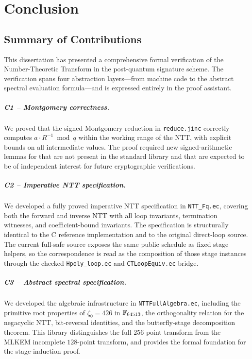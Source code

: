 
\chapter{Conclusion}
\label{ch:conclusion}

\section{Summary of Contributions}

This dissertation has presented a comprehensive formal verification of the
Number-Theoretic Transform in the \haetae{} post-quantum signature scheme.
The verification spans four abstraction layers---from \jasmin{} machine code
to the abstract spectral evaluation formula---and is expressed entirely in the
\easycrypt{} proof assistant.

\paragraph{C1 -- Montgomery correctness.}
We proved that the signed Montgomery reduction in \texttt{reduce.jinc}
correctly computes $a \cdot R^{-1} \bmod q$ within the working range of the
NTT, with explicit bounds on all intermediate values.  The proof required
new signed-arithmetic lemmas for \easycrypt{} that are not present in the
standard library and that are expected to be of independent interest for
future cryptographic verifications.

\paragraph{C2 -- Imperative NTT specification.}
We developed a fully proved imperative NTT specification in \texttt{NTT\_Fq.ec},
covering both the forward and inverse NTT with all loop invariants,
termination witnesses, and coefficient-bound invariants.  The specification is
structurally identical to the C reference implementation and to the original
direct-loop \jasmin{} source.  The current full-safe \jasmin{} source exposes
the same public schedule as fixed stage helpers, so the correspondence is read
as the composition of those stage instances through the checked
\texttt{Hpoly\_loop.ec} and \texttt{CTLoopEquiv.ec} bridge.

\paragraph{C3 -- Abstract spectral specification.}
We developed the algebraic infrastructure in \texttt{NTTFullAlgebra.ec},
including the primitive root properties of $\zeta_0 = 426$ in $\mathbb{F}_{64513}$,
the orthogonality relation for the negacyclic NTT, bit-reversal identities,
and the butterfly-stage decomposition theorem.  This library distinguishes
the \haetae{} full $256$-point transform from the MLKEM incomplete
$128$-point transform, and provides the formal foundation for the
stage-induction proof.

